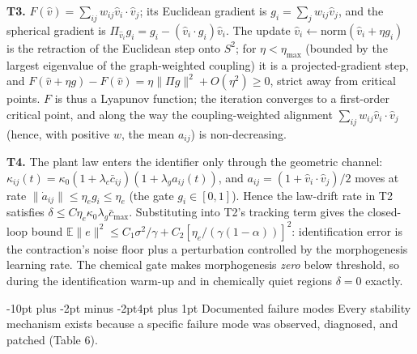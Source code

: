 \documentclass[10pt]{article}
\makeatletter
\renewcommand\subsection{\@startsection{subsection}{2}{\z@}%
  {-10pt plus -2pt minus -2pt}{4pt plus 1pt}%
  {\normalfont\bfseries\normalsize}}
\makeatother
\begin{document}
\textbf{T3.} $F(\hat v) = \sum_{ij} w_{ij}\hat v_i{\cdot}\hat v_j$; its Euclidean
gradient is $g_i = \sum_j w_{ij}\hat v_j$, and the spherical gradient is
$\Pi_{\hat v_i}g_i = g_i - (\hat v_i{\cdot}g_i)\hat v_i$. The update
$\hat v_i \leftarrow \mathrm{norm}(\hat v_i + \eta g_i)$ is the retraction of the
Euclidean step onto $S^2$; for $\eta < \eta_{\max}$ (bounded by the largest
eigenvalue of the graph-weighted coupling) it is a projected-gradient step, and
$F(\hat v + \eta g) - F(\hat v) = \eta\|\Pi g\|^2 + O(\eta^2) \ge 0$, strict away
from critical points. $F$ is thus a Lyapunov function; the iteration converges to a
first-order critical point, and along the way the coupling-weighted alignment
$\sum_{ij} w_{ij}\hat v_i{\cdot}\hat v_j$ (hence, with positive $w$, the mean
$a_{ij}$) is non-decreasing.

\textbf{T4.} The plant law enters the identifier only through the geometric
channel: $\kappa_{ij}(t) = \kappa_0(1+\lambda_c\bar c_{ij})(1+\lambda_g a_{ij}(t))$,
and $a_{ij} = (1+\hat v_i{\cdot}\hat v_j)/2$ moves at rate
$\|\dot a_{ij}\| \le \eta_e g_i \le \eta_e$ (the gate $g_i \in [0,1]$). Hence the
law-drift rate in T2 satisfies $\delta \le C\eta_e\kappa_0\lambda_g\bar c_{\max}$.
Substituting into T2's tracking term gives the closed-loop bound
$\mathbb{E}\|e\|^2 \le C_1\sigma^2/\gamma + C_2[\eta_e/(\gamma(1-\alpha))]^2$:
identification error is the contraction's noise floor plus a perturbation
controlled by the morphogenesis learning rate. The chemical gate makes
morphogenesis \emph{zero} below threshold, so during the identification
warm-up and in chemically quiet regions $\delta = 0$ exactly.

\subsection{Documented failure modes}
Every stability mechanism exists because a specific failure mode was observed,
diagnosed, and patched (Table 6).
\end{document}
